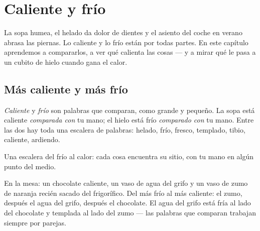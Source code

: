 \chapter{Caliente y frío}\label{ch:g1:hot-and-cold}

La sopa humea, el helado da dolor de dientes y el asiento del coche en
verano abrasa las piernas. Lo caliente y lo frío están por todas
partes. En este capítulo aprendemos a compararlos, a ver qué calienta
las cosas --- y a mirar qué le pasa a un cubito de hielo cuando gana
el calor.

\section{Más caliente y más frío}

\begin{definition}\label{def:g1:hot-and-cold:words}
\emph{Caliente} y \emph{frío} son palabras
que comparan, como grande y pequeño. La sopa está caliente
\emph{comparada con} tu mano; el hielo está frío \emph{comparado con}
tu mano. Entre las dos hay toda una escalera de palabras: helado,
frío, fresco, templado, tibio, caliente, ardiendo.
\end{definition}

\begin{omfigure}

{\small Una escalera del frío al calor: cada cosa encuentra su sitio,
con tu mano en algún punto del medio.}
\end{omfigure}

\begin{example}\label{ex:g1:hot-and-cold:drinks}
En la mesa: un chocolate caliente, un vaso de agua del grifo y un vaso
de zumo de naranja recién sacado del frigorífico. Del más frío al más
caliente: el zumo, después el agua del grifo, después el chocolate. El
agua del grifo está fría al lado del chocolate y templada al lado del
zumo --- las palabras que comparan trabajan siempre por parejas.
\end{example}

